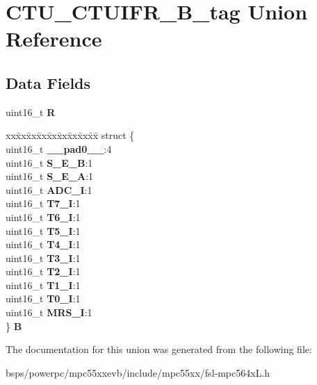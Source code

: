 \hypertarget{unionCTU__CTUIFR__16B__tag}{}\section{C\+T\+U\+\_\+\+C\+T\+U\+I\+F\+R\+\_\+B\+\_\+tag Union Reference}
\label{unionCTU__CTUIFR__16B__tag}
\subsection*{Data Fields}
\begin{DoxyCompactItemize}
\item 
\mbox{\label{unionCTU__CTUIFR__16B__tag_a4e60dc3cb228eefa54eafa445ebc85ed}} 
uint16\+\_\+t {\bfseries R}
\item 
\mbox{\label{unionCTU__CTUIFR__16B__tag_a44ea1b98caa4e968020b9c5f0c8da839}} 
\begin{tabbing}
xx\=xx\=xx\=xx\=xx\=xx\=xx\=xx\=xx\=\kill
struct \{\\
\>uint16\_t {\bfseries \_\_pad0\_\_}:4\\
\>uint16\_t {\bfseries S\_E\_B}:1\\
\>uint16\_t {\bfseries S\_E\_A}:1\\
\>uint16\_t {\bfseries ADC\_I}:1\\
\>uint16\_t {\bfseries T7\_I}:1\\
\>uint16\_t {\bfseries T6\_I}:1\\
\>uint16\_t {\bfseries T5\_I}:1\\
\>uint16\_t {\bfseries T4\_I}:1\\
\>uint16\_t {\bfseries T3\_I}:1\\
\>uint16\_t {\bfseries T2\_I}:1\\
\>uint16\_t {\bfseries T1\_I}:1\\
\>uint16\_t {\bfseries T0\_I}:1\\
\>uint16\_t {\bfseries MRS\_I}:1\\
\} {\bfseries B}\\

\end{tabbing}\end{DoxyCompactItemize}


The documentation for this union was generated from the following file\+:\begin{DoxyCompactItemize}
\item 
bsps/powerpc/mpc55xxevb/include/mpc55xx/fsl-\/mpc564x\+L.\+h\end{DoxyCompactItemize}
